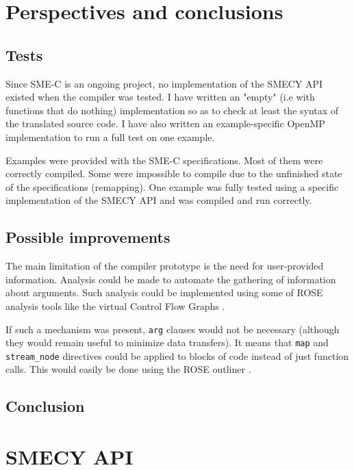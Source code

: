 \documentclass [A4]{article}
\begin{document}
\section{Perspectives and conclusions}
	\subsection{Tests}
	Since SME-C is an ongoing project, no implementation of the SMECY API existed when the compiler was tested. I have written an "empty" (i.e with functions that do nothing) implementation so as to check at least the syntax of the translated source code. I have also written an example-specific OpenMP implementation to run a full test on one example.
	
	Examples were provided with the SME-C specifications. Most of them were correctly compiled. Some were impossible to compile due to the unfinished state of the specifications (remapping). One example was fully tested using a specific implementation of the SMECY API and was compiled and run correctly.
	
	\subsection{Possible improvements}
	The main limitation of the compiler prototype is the need for user-provided information. Analysis could be made to automate the gathering of information about arguments. Such analysis could be implemented using some of ROSE analysis tools like the virtual Control Flow Graphs \cite{tuto}.
	
	If such a mechanism was present, \verb+arg+ clauses would not be necessary (although they would remain useful to minimize data transfers). It means that \verb+map+ and \verb+stream_node+ directives could be applied to blocks of code instead of just function calls. This would easily be done using the ROSE outliner \cite{tuto,outliner}.
	
	\subsection{Conclusion}
	
	\newpage
	\appendix
	\section{SMECY API}
	\label{api}
\end{document}
